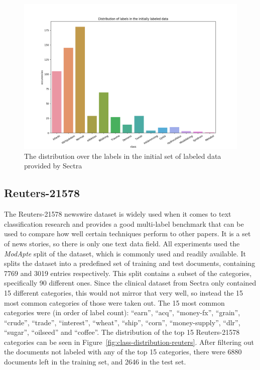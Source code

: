 \begin{figure}
    \includegraphics[width=\textwidth]{figures/class-distribution.png}
    \caption{The distribution over the labels in the initial set of labeled data provided by Sectra}
    \label{fig:class-distribution}
\end{figure}

\subsection{Reuters-21578}

The Reuters-21578 newswire dataset is widely used when it comes to text classification research and provides a good multi-label benchmark that can be used to compare how well certain techniques perform to other papers.
It is a set of news stories, so there is only one text data field.
All experiments used the \textit{ModApte} split of the dataset, which is commonly used and readily available.
It splits the dataset into a predefined set of training and test documents, containing 7769 and 3019 entries respectively.
This split contains a subset of the categories, specifically 90 different ones.
Since the clinical dataset from Sectra only contained 15 different categories, this would not mirror that very well, so instead the 15 most common categories of those were taken out.
The 15 most common categories were (in order of label count): ``earn'', ``acq'', ``money-fx'', ``grain'', ``crude'', ``trade'', ``interest'', ``wheat'', ``ship'', ``corn'', ``money-supply'', ``dlr'', ``sugar'', ``oilseed'' and ``coffee''.
The distribution of the top 15 Reuters-21578 categories can be seen in Figure~\ref{fig:class-distribution-reuters}.
After filtering out the documents not labeled with any of the top 15 categories, there were 6880 documents left in the training set, and 2646 in the test set.

